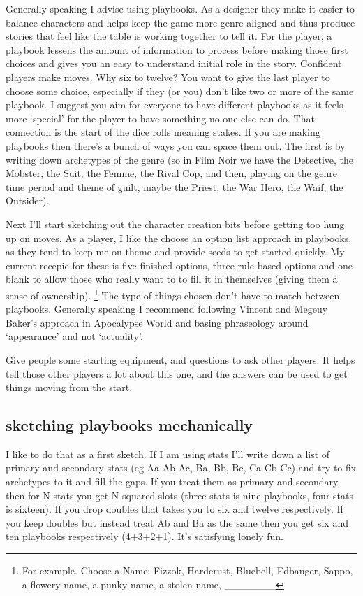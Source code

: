 \documentclass{tufte-handout}
\begin{document}
Generally speaking I advise using playbooks. As a designer they make it easier to balance characters and helps keep the game more genre aligned and thus produce stories that feel like the table is working together to tell it. For the player, a playbook lessens the amount of information to process before making those first choices and gives you an easy to understand initial role in the story. Confident players make moves.
Why six to twelve? You want to give the last player to choose some choice, especially if they (or you) don't like two or more of the same playbook. I suggest you aim for everyone to have different playbooks as it feels more `special' for the player to have something no-one else can do. That connection is the start of the dice rolls meaning stakes.
If you are making playbooks then there's a bunch of ways you can space them out.  The first is by writing down archetypes of the genre (so in Film Noir we have the Detective, the Mobster, the Suit, the Femme, the Rival Cop, and then, playing on the genre time period and theme of guilt, maybe the Priest, the War Hero, the Waif, the Outsider). 

Next I'll start sketching out the character creation bits before getting too hung up on moves. 
As a player, I like the choose an option list approach in playbooks, as they tend to keep me on theme and provide seeds to get started quickly. My current recepie for these is five finished options, three rule based options and one blank to allow those who really want to to fill it in themselves (giving them a sense of ownership). \footnote{For example. Choose a Name: Fizzok, Hardcrust, Bluebell, Edbanger, Sappo, a flowery name, a punky name, a stolen name, \_\_\_\_\_\_\_}  The type of things chosen don't have to match between playbooks. Generally speaking I recommend following Vincent and Megeuy Baker's approach in Apocalypse World and basing phraseology around `appearance' and not `actuality'. 

Give people some starting equipment, and questions to ask other players. It helps tell those other players a lot about this one, and the answers can be used to get things moving from the start.


\subsection{sketching playbooks mechanically}
I like to do that as a first sketch. If I am using stats I'll write down a list of primary and secondary stats (eg Aa Ab Ac, Ba, Bb, Bc, Ca Cb Cc) and try to fix archetypes to it and fill the gaps. If you treat them as primary and secondary, then for N stats you get N squared slots (three stats is nine playbooks, four stats is sixteen). If you drop doubles that takes you to six and twelve respectively. If you keep doubles but instead treat Ab and Ba as the same then you get six and ten playbooks respectively (4+3+2+1). It's satisfying lonely fun. 
\end{document}
